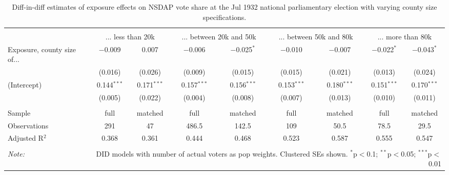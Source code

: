 
\begin{table}[!htbp] \centering 
  \caption{Diff-in-diff estimates of exposure effects on NSDAP vote share at the Jul 1932 national parliamentary election with varying county size specifications.\vspace{-.25cm}} 
  \label{tab:nsdap-voteshare-countysize-dd-1932-1} 
\scriptsize 
\begin{tabular}{@{\extracolsep{5pt}}lcccccccc} 
\\[-1.8ex]\hline 
\hline \\[-1.8ex] 
 & \multicolumn{2}{c}{... less than 20k } & \multicolumn{2}{c}{... between 20k and 50k} & \multicolumn{2}{c}{... between 50k and 80k} & \multicolumn{2}{c}{... more than 80k} \\ 
 \cmidrule(r){2-3}\cmidrule(r){4-5}\cmidrule(r){6-7}\cmidrule(r){8-9}Exposure, county size of... & $-$0.009 & 0.007 & $-$0.006 & $-$0.025$^{*}$ & $-$0.010 & $-$0.007 & $-$0.022$^{*}$ & $-$0.043$^{*}$ \\ 
  & (0.016) & (0.026) & (0.009) & (0.015) & (0.015) & (0.021) & (0.013) & (0.024) \\ 
  (Intercept) & 0.144$^{***}$ & 0.171$^{***}$ & 0.157$^{***}$ & 0.156$^{***}$ & 0.153$^{***}$ & 0.180$^{***}$ & 0.151$^{***}$ & 0.170$^{***}$ \\ 
  & (0.005) & (0.022) & (0.004) & (0.008) & (0.007) & (0.013) & (0.010) & (0.011) \\ 
 \hline \\[-1.8ex] 
Sample & full & matched & full & matched & full & matched & full & matched \\ 
Observations & 291 & 47 & 486.5 & 142.5 & 109 & 50.5 & 78.5 & 29.5 \\ 
Adjusted R$^{2}$ & 0.368 & 0.361 & 0.444 & 0.468 & 0.523 & 0.587 & 0.555 & 0.547 \\ 
\hline 
\hline \\[-1.8ex] 
\textit{Note:}  & \multicolumn{8}{r}{DID models with number of actual voters as pop weights. Clustered SEs shown. $^{*}$p$<$0.1; $^{**}$p$<$0.05; $^{***}$p$<$0.01} \\ 
\end{tabular} 
\end{table} 
